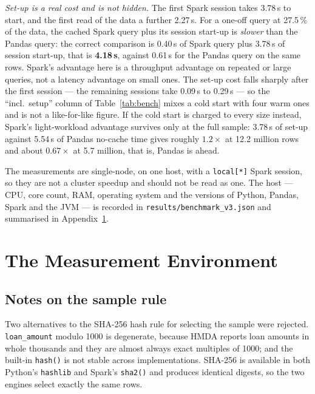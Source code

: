 \documentclass[sigconf,balance=false]{acmart}
\begin{document}
\emph{Set-up is a real cost and is not hidden.} The first Spark session
takes 3.78\,s to start, and the first read of the data a further 2.27\,s.
For a one-off query at 27.5\,\% of the data, the cached Spark query plus
its session start-up is \emph{slower} than the Pandas query: the correct
comparison is 0.40\,s of Spark query plus 3.78\,s of session start-up,
that is \textbf{4.18\,s}, against 0.61\,s for the Pandas query on the
same rows. Spark's advantage here is a throughput advantage on repeated or
large queries, not a latency advantage on small ones. The set-up cost
falls sharply after the first session --- the remaining sessions take
0.09\,s to 0.29\,s --- so the ``incl.\ setup'' column of
Table~\ref{tab:bench} mixes a cold start with four warm ones and is not a
like-for-like figure. If the cold start is charged to every size instead,
Spark's light-workload advantage survives only at the full sample:
3.78\,s of set-up against 5.54\,s of Pandas no-cache time gives roughly
$1.2\times$ at 12.2 million rows and about $0.67\times$ at 5.7 million,
that is, Pandas is ahead.

The measurements are single-node, on one host, with a \texttt{local[*]}
Spark session, so they are not a cluster speedup and should not be read as
one. The host --- CPU, core count, RAM, operating system and the versions
of Python, Pandas, Spark and the JVM --- is recorded in
\texttt{results/benchmark\_\allowbreak v3.json} and summarised in
Appendix~\ref{app:env}.

\FloatBarrier

\section{The Measurement Environment}\label{app:env}

\subsection{Notes on the sample rule}\label{app:perfdetail}

Two alternatives to the SHA-256 hash rule for selecting the sample were
rejected. \texttt{loan\_\allowbreak amount} modulo 1000 is degenerate,
because HMDA reports loan amounts in whole thousands and they are almost
always exact multiples of 1000; and the built-in \texttt{hash()} is not
stable across implementations. SHA-256 is available in both Python's
\texttt{hashlib} and Spark's \texttt{sha2()} and produces identical
digests, so the two engines select exactly the same rows.
\end{document}
